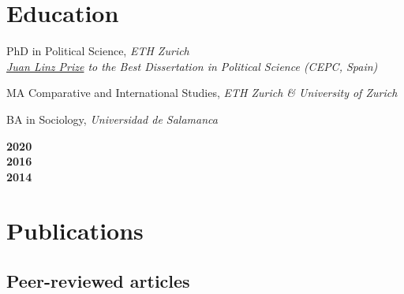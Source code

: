\documentclass[a4paper, 12pt]{article}
\begin{document}
\vspace{-0pt}
\section*{Education}

\begin{minipage}[t]{0.89\textwidth}
  PhD in Political Science, \textit{ETH Zurich}\\
  {\color{white}{--}} \textit{\small \href{https://www.cepc.gob.es/premio-juan-linz}{Juan Linz Prize} to the Best Dissertation in Political Science (CEPC, Spain)}
  \vspace{3pt}

  MA Comparative and International Studies, \textit{ETH Zurich \& University of Zurich}
	\vspace{3pt}

	BA in Sociology, \textit{Universidad de Salamanca}\\
\end{minipage}
\begin{minipage}[t]{0.10\textwidth}
  \flushright
	\textbf{2020}\\\vspace{24pt}
  \textbf{2016}\\\vspace{8pt}
	\textbf{2014}
\end{minipage}

\section*{Publications}

\subsection*{Peer-reviewed articles}
\end{document}
